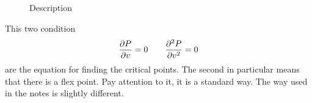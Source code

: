 \documentclass[../main/main.tex]{subfiles}
\begin{document}
\begin{figure}[h!]
\begin{minipage}[c]{0.5\linewidth}
\end{minipage}
\begin{minipage}[]{0.5\linewidth}
\centering
{}
\end{minipage}
\caption{\label{fig:} Description}
\end{figure}




This two condition
\begin{equation}
  \pdv{P}{v} = 0 \qquad \pdv[2]{P}{v} = 0
\end{equation}
are the equation for finding the critical points. The second in particular means that there is a flex point. Pay attention to it, it is a standard way. The way used in the notes is slightly different.
\end{document}

